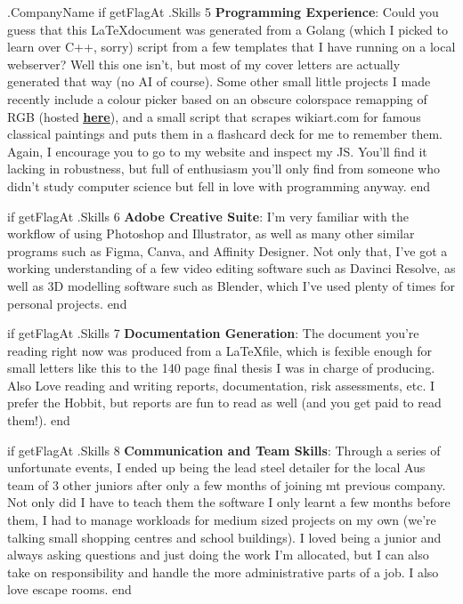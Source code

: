 \documentclass[10pt]{letter}
\begin{document}
\begin{letter}{
    {{ .CompanyName }}
}
{{ if getFlagAt .Skills 5 }}
\textbf{Programming Experience}: Could you guess that this \LaTeX document was generated from a Golang (which I picked to learn over C++, sorry) script from a few templates that I have running on a local webserver? Well this one isn't, but most of my cover letters are actually generated that way (no AI of course). Some other small little projects I made recently include a colour picker based on an obscure colorspace remapping of RGB (hosted \underline{\textbf{\href{https://zabuzabuzazaa.xyz/home/ok_palette/}{here}}}), and a small script that scrapes wikiart.com for famous classical paintings and puts them in a flashcard deck for me to remember them. Again, I encourage you to go to my website and inspect my JS. You'll find it lacking in robustness, but full of enthusiasm you'll only find from someone who didn't study computer science but fell in love with programming anyway. 
{{ end }}

{{ if getFlagAt .Skills 6 }}
\textbf{Adobe Creative Suite}: I'm very familiar with the workflow of using Photoshop and Illustrator, as well as many other similar programs such as Figma, Canva, and Affinity Designer. Not only that, I've got a working understanding of a few video editing software such as Davinci Resolve, as well as 3D modelling software such as Blender, which I've used plenty of times for personal projects. 
{{ end }}

{{ if getFlagAt .Skills 7 }}
\textbf{Documentation Generation}: The document you're reading right now was produced from a \LaTeX file, which is fexible enough for small letters like this to the 140 page final thesis I was in charge of producing. Also Love reading and writing reports, documentation, risk assessments, etc. I prefer the Hobbit, but reports are fun to read as well (and you get paid to read them!). 
{{ end }}

{{ if getFlagAt .Skills 8 }}
\textbf{Communication and Team Skills}: Through a series of unfortunate events, I ended up being the lead steel detailer for the local Aus team of 3 other juniors after only a few months of joining mt previous company. Not only did I have to teach them the software I only learnt a few months before them, I had to manage workloads for medium sized projects on my own (we're talking small shopping centres and school buildings). I loved being a junior and always asking questions and just doing the work I'm allocated, but I can also take on responsibility and handle the more administrative parts of a job. I also love escape rooms. 
{{ end }}


\end{letter}
\end{document}
